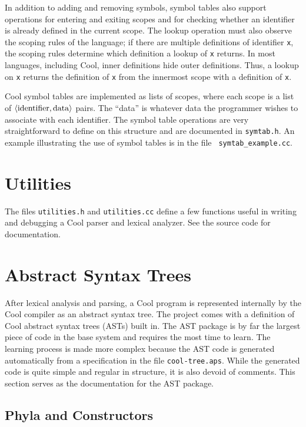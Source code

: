 \documentclass[11pt]{article}
\newcommand{\la}{\langle}
\newcommand{\ra}{\rangle}
\begin{document}
In addition to adding and removing symbols, symbol tables also support
operations for entering and exiting scopes and for checking whether an
identifier is already defined in the current scope.  The lookup
operation must also observe the scoping rules of the language; if
there are multiple definitions of identifier {\tt x}, the scoping
rules determine which definition a lookup of {\tt x} returns.  In most
languages, including Cool, inner definitions hide outer definitions.
Thus, a lookup on {\tt x} returns the definition of {\tt x} from the
innermost scope with a definition of {\tt x}.

Cool symbol tables are implemented as lists of scopes, where each
scope is a list of $\rm \la identifier,data \ra$ pairs.  The ``data''
is whatever data the programmer wishes to associate with each
identifier.  The symbol table operations are very straightforward to
define on this structure and are documented in {\tt symtab.h}.  An
example illustrating the use of symbol tables is in the file {\tt
symtab\_example.cc}.

\section{Utilities}

The files {\tt utilities.h} and {\tt utilities.cc} define a few
functions useful in writing and debugging a Cool parser and lexical
analyzer.  See the source code for documentation.

\section{Abstract Syntax Trees}

After lexical analysis and parsing, a Cool program is represented
internally by the Cool compiler as an abstract syntax tree.  The
project comes with a definition of Cool abstract syntax trees (ASTs)
built in.  The AST package is by far the largest piece of code in the
base system and requires the most time to learn.  The learning process
is made more complex because the AST code is generated automatically
from a specification in the file {\tt cool-tree.aps}.  While the
generated code is quite simple and regular in structure, it is also
devoid of comments.  This section serves as the documentation for the
AST package.


\subsection{Phyla and Constructors}
\end{document}
